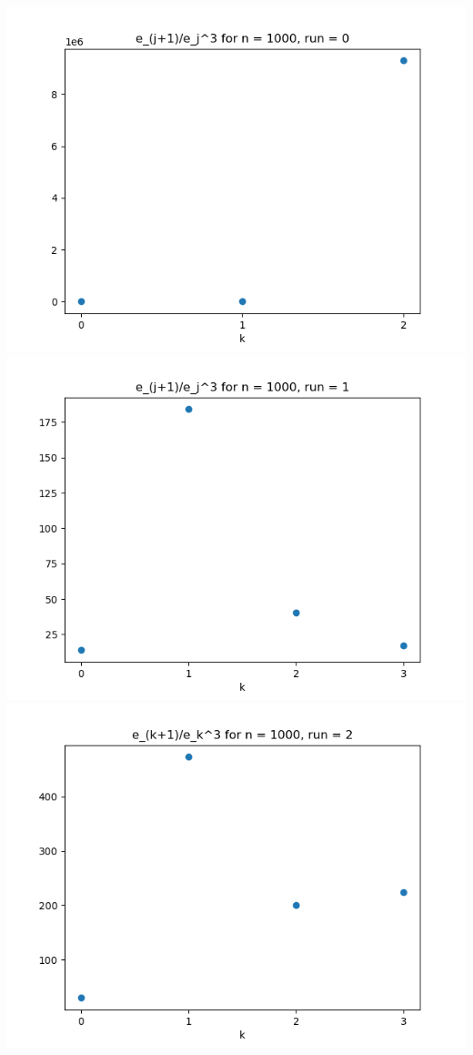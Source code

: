 \documentclass{article}
\begin{document}
\begin{enumerate}
\begin{enumerate}
\begin{center}
			\includegraphics[scale=.4]{hw4 err n = 1000 run = 0}
			\includegraphics[scale=.4]{hw4 err n = 1000 run = 1}
			\includegraphics[scale=.4]{hw4 err n = 1000 run = 2}

\end{center}
\end{enumerate}
\end{enumerate}
\end{document}
